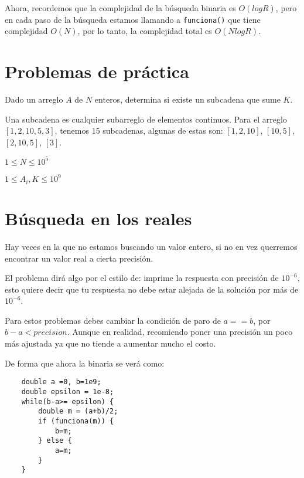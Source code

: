 Ahora, recordemos que la complejidad de la búsqueda binaria es \(O(logR)\), pero en cada paso de la búsqueda estamos llamando a \verb|funciona()| que tiene complejidad \(O(N)\), por lo tanto, la complejidad total es \(O(NlogR)\).

\section*{Problemas de práctica}

\problemtitle 

\problembreak

\problemtitle Dado un arreglo \(A\) de \(N\) enteros, determina si existe un subcadena que sume \(K\).

Una subcadena es cualquier subarreglo de elementos continuos. Para el arreglo \([1, 2, 10, 5, 3]\), tenemos 15 subcadenas, algunas de estas son: \([1,2,10]\),
\([10,5]\), \([2,10,5]\), \([3]\).
\begin{plimits}
	\item \(1\leq N \leq 10^5\)
	\item \(1\leq A_i, K \leq 10^9\)
\end{plimits}


\newpage
\section*{Búsqueda en los reales}

Hay veces en la que no estamos buscando un valor entero, si no en vez querremos encontrar un valor real a cierta precisión.

El problema dirá algo por el estilo de: imprime la respuesta con precisión de \(10^{-6}\), esto quiere decir que tu respuesta no debe estar alejada de la solución por más de \(10^{-6}\).

Para estos problemas debes cambiar la condición de paro de \(a==b\), por \(b-a < precision\). Aunque en realidad, recomiendo poner una precisión un poco más ajustada ya que no tiende a aumentar mucho el costo.

De forma que ahora la binaria se verá como:

\begin{lstlisting}
	double a =0, b=1e9;
	double epsilon = 1e-8;
	while(b-a>= epsilon) {
		double m = (a+b)/2;
		if (funciona(m)) {
			b=m;
		} else {
			a=m;
		}
	}
\end{lstlisting}

